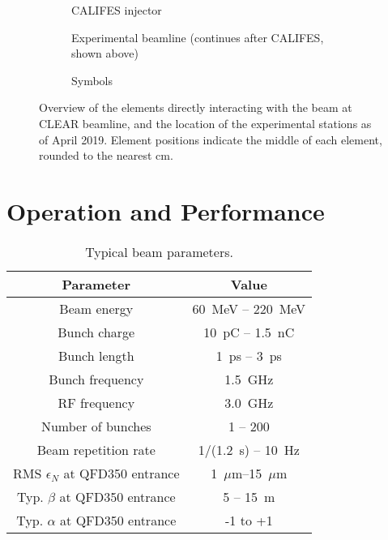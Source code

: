 \documentclass[a4paper,
               keeplastbox,   %
               ]{jacow}
\begin{document}
\begin{figure*}[t]
  \centering
  \begin{subfigure}{\textwidth}
    \centering
    
    \vspace{-2.5em} %
    \caption{CALIFES injector}
  \end{subfigure}
  \begin{subfigure}{\textwidth}
    \centering
    \vspace{-1em}
    
    \vspace{-0.5em}
    \caption{Experimental beamline
      (continues after CALIFES, shown above)}
  \end{subfigure}
  \begin{subfigure}{\textwidth}
    \centering
    \vspace{-0.5em}
    
    \vspace{-2em} %
    \caption{Symbols}
  \end{subfigure}
  \caption{Overview of the elements directly interacting with the beam at CLEAR beamline, and the location of the experimental stations as of April 2019. Element positions indicate the middle of each element, rounded to the nearest cm.}
  \label{fig:layout}
\end{figure*}

\section{Operation and Performance}

\begin{table}[t]
  \centering
  \caption{Typical beam parameters.}
  \label{tab:beamparameters}
  \begin{tabular}{c c}
    \toprule
    \textbf{Parameter} & \textbf{Value} \\
    \midrule
    Beam energy       &  60~MeV -- 220~MeV\\
    Bunch charge      &  10~pC  -- 1.5~nC \\
    Bunch length      &   1~ps  -- 3~ps \\
    Bunch frequency   &   1.5~GHz \\
    RF frequency      &   3.0~GHz \\
    Number of bunches &   1 -- 200 \\
    Beam repetition rate   & 1/(1.2~s) -- 10~Hz \\
    RMS $\epsilon_N$ at QFD350 entrance & 1~$\mu$m--15~$\mu$m\\
    Typ. $\beta$ at QFD350 entrance & 5 -- 15~m \\
    Typ. $\alpha$ at QFD350 entrance & -1 to +1 \\
    \bottomrule
  \end{tabular}
\end{table}
\end{document}
